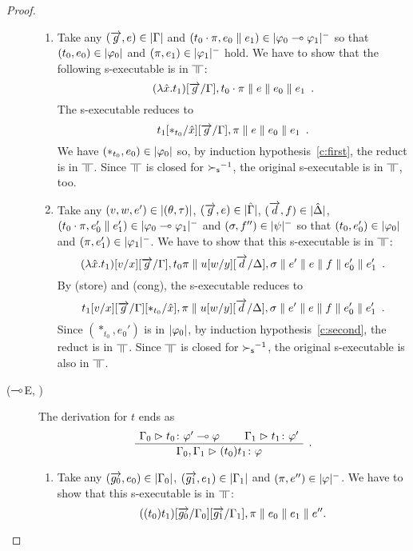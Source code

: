 \begin{proof}
\begin{description}
\begin{enumerate}[label=\textit{(\arabic{*})}]
	 \item Take any
	       $(\overrightarrow g, e)\in|{\Gamma}|$
	       and
	       $(t_0\cdot\pi,e_0\parallel e_1)\in|{\varphi_0\multimap\varphi_1}|^-$
	       so that $(t_0,e_0)\in|{\varphi_0}|$ and
	       $(\pi,e_1)\in|{\varphi_1}|^-$ hold.
	       We have to show that the following s-executable is in
	       $\bbot$:
	       \[
	       (\lambda\hat x.t_1)[\overrightarrow g/\Gamma],
	       t_0\cdot\pi\parallel e\parallel e_0\parallel e_1\enspace.
	       \]
	       The s-executable reduces to
	       \[
		t_1[\ast_{t_0}/\hat x][\overrightarrow{g}/\Gamma],\pi\parallel{e}\parallel e_0\parallel{e_1}\enspace.
	       \]
	       We have $(\ast_{t_0}, e_0)\in|{\varphi_0}|$ so, by
	       induction hypothesis~\ref{c:first},
	       the reduct is in $\bbot$.
	       Since $\bbot$ is closed for ${\succ_{\mathsf s}}^{-1}$, the original
	       s-executable is in $\bbot$, too.
	 \item Take any $(v,w,e')\in|{(\theta,\tau)}|$,
	       $(\overrightarrow g, e)\in|{\hat{\Gamma}}|$,
	       $(\overrightarrow d, f)\in|{\hat{\Delta}}|$,
	       $(t_0\cdot\pi,e_0'\parallel e_1')\in|{\varphi_0\multimap\varphi_1}|^-$ and
	       $(\sigma,f'')\in|{\psi}|^-$ so that
	       $(t_0,e_0')\in|{\varphi_0}|$ and
	       $(\pi,e_1')\in|{\varphi_1}|^-$.
	       We have to show that this s-executable is in $\bbot$:
	       \[
	       (\lambda \hat x. t_1)[v/x][\overrightarrow{g}/\Gamma],t_0\pi\parallel
	       u[w/y][\overrightarrow{d}/\Delta],\sigma\parallel
	       e'\parallel {e}\parallel {f} \parallel{e_0'}\parallel{e_1'}\enspace.
	       \]
	       By (store) and (cong), the s-executable reduces to
	       \[
		t_1[v/x][\overrightarrow{g}/\Gamma][\ast_{t_0}/\hat x],\pi\parallel
	       u[w/y][\overrightarrow{d}/\Delta],\sigma\parallel
	       e'\parallel {e}\parallel {f} \parallel{e_0'}\parallel{e_1'}\enspace.
	       \]
	       Since $(\ast_{t_0},e_0')$ is in $|{\varphi_0}|$,
	       by induction hypothesis~\ref{c:second}, the reduct is in
	       $\bbot$.  Since $\bbot$ is closed for ${\succ_{\mathsf s}}^{-1}$,
	       the original s-executable is also in $\bbot$.
	\end{enumerate}
   \item[($\multimap$E, \textminus)]
	The derivation for $t$ ends as
	\[
	\aseq{\G_0}{\tj{t_0}{\phi'\limp\phi}}
	\aseq{\G_1}{\tj{t_1}{\phi'}}
	\bseq{\G_0,\G_1}{\tj{(t_0)t_1}{\phi}}
	\DisplayProof\enspace.
	\]
	\begin{enumerate}[label=\textit{(\arabic{*})}]
	 \item Take any
	       $(\overrightarrow{g_0},{e_0})\in|{\Gamma_0}|$,
	       $(\overrightarrow{g_1},{e_1})\in|{\Gamma_1}|$ and
	       $(\pi,e'')\in|{\varphi}|^-$.
	       We have to show that this s-executable is in $\bbot$:
	       \[
		((t_0)t_1)[\overrightarrow{g_0}/\Gamma_0][\overrightarrow{g_1}/\Gamma_1],\pi\parallel
	       {e_0}\parallel {e_1}\parallel e''.
\]
\end{enumerate}
\end{description}
\end{proof}
